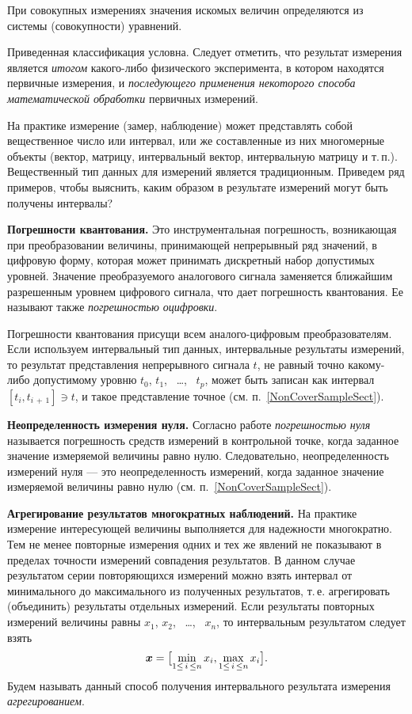 \documentclass[a5paper,openany]{book}
\newcommand{\mbf}[1]{\protect\text{\boldmath$#1$}}
\begin{document}
{{При совокупных измерениях значения искомых величин определяются из системы (совокупности)   уравнений. 


Приведенная классификация условна. Следует отметить, что результат измерения является \emph{итогом} какого-либо физического эксперимента, в котором находятся первичные измерения, и \emph{последующего применения некоторого способа	математической обработки} первичных измерений. 

На практике измерение (замер, наблюдение) может представлять собой вещественное число или интервал, или же составленные из них многомерные объекты (вектор, матрицу, интервальный вектор, 
интервальную матрицу и т.\,п.). 
Вещественный тип данных для измерений является традиционным. 
Приведем ряд примеров, чтобы выяснить, каким образом в результате измерений могут быть получены интервалы? 

{\bf Погрешности квантования.}  
Это инструментальная погрешность, возникающая при преобразовании величины, принимающей 
непрерывный ряд значений, в цифровую форму, которая может принимать дискретный набор 
допустимых уровней. Значение преобразуемого аналогового сигнала 
заменяется ближайшим разрешенным уровнем цифрового сигнала, что дает  погрешность квантования.  
Ее называют также \emph{погрешностью оцифровки}. 

Погрешности квантования присущи всем аналого-цифровым преобразователям. Если используем интервальный тип данных, интервальные результаты измерений, то результат представления непрерывного сигнала $t$, 
не равный точно какому-либо допустимому уровню $t_0$, $t_1$, \ \ldots, \ $t_p$, может быть 
записан как интервал $[t_{i}, t_{i \, + \, 1}]\ni t$,  и такое представление точное (см. п.~\ref{NonCoverSampleSect}).

{\bf Неопределенность измерения нуля.}
Согласно  работе \cite{RMG29-2013} \emph{погрешностью нуля} называется погрешность средств 
измерений в контрольной точке, когда заданное значение измеряемой величины равно нулю. 
 Следовательно, неопределенность измерений нуля --- это 
неопределенность измерений, когда заданное значение измеряемой величины равно нулю (см. п.~\ref{NonCoverSampleSect}). 

{\bf Агрегирование результатов многократных наблюдений.} 
На практике измерение интересующей величины выполняется 
для надежности многократно. Тем не менее повторные измерения одних и тех же 
явлений не показывают  в пределах точности измерений совпадения результатов. 
В  данном случае результатом серии повторяющихся измерений можно взять интервал 
от минимального до максимального из полученных результатов, т.\,е. агрегировать 
(объединить) результаты отдельных измерений.  
Если результаты повторных измерений величины равны $x_1$, $x_2$, \
\ldots, \ $x_n$, то интервальным результатом следует взять 
\begin{equation*} 
	\mbf{x} = \bigl[\min_{1\leq \,i \,\leq n} x_{i}, \max_{1\leq \,i \,\leq n} x_{i}\bigr].  
\end{equation*} 
Будем называть данный способ получения интервального результата измерения 
\emph{агрегированием}. 

}}
\end{document}
